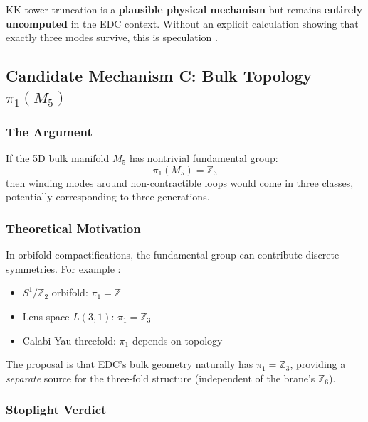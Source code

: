 \begin{tcolorbox}[colback=red!5, colframe=red!50!black,
    title=\textbf{Mechanism B Verdict: RED}]
KK tower truncation is a \textbf{plausible physical mechanism} but remains
\textbf{entirely uncomputed} in the EDC context. Without an explicit calculation
showing that exactly three modes survive, this is speculation \tagP{}.
\end{tcolorbox}

\subsection{\texorpdfstring{Candidate Mechanism C: Bulk Topology $\pi_1(M_5)$}{Candidate Mechanism C: Bulk Topology pi1(M5)}}
\label{sec:ch5_mechanism_c}

\subsubsection{The Argument}

If the 5D bulk manifold $M_5$ has nontrivial fundamental group:
\begin{equation}
    \pi_1(M_5) = \mathbb{Z}_3
    \label{eq:ch5_pi1}
\end{equation}
then winding modes around non-contractible loops would come in three classes,
potentially corresponding to three generations.

\subsubsection{Theoretical Motivation}

In orbifold compactifications, the fundamental group can contribute discrete
symmetries. For example \tagBL{}:
\begin{itemize}[nosep]
    \item $S^1/\mathbb{Z}_2$ orbifold: $\pi_1 = \mathbb{Z}$
    \item Lens space $L(3,1)$: $\pi_1 = \mathbb{Z}_3$
    \item Calabi-Yau threefold: $\pi_1$ depends on topology
\end{itemize}

The proposal is that EDC's bulk geometry naturally has $\pi_1 = \mathbb{Z}_3$,
providing a \emph{separate} source for the three-fold structure (independent
of the brane's $\mathbb{Z}_6$).

\subsubsection{Stoplight Verdict}

